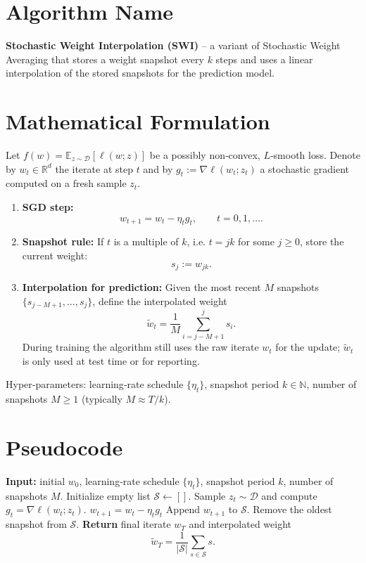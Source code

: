 \documentclass{article}
\newcommand{\E}{\mathbb{E}}
\begin{document}
\section*{Algorithm Name}
\textbf{Stochastic Weight Interpolation (SWI)} – a variant of Stochastic Weight Averaging that stores a weight snapshot every $k$ steps and uses a linear interpolation of the stored snapshots for the prediction model.

\section*{Mathematical Formulation}
Let $f(w)=\E_{z\sim\mathcal{D}}[\ell(w;z)]$ be a possibly non‑convex, $L$‑smooth loss.  
Denote by $w_t\in\mathbb{R}^d$ the iterate at step $t$ and by $g_t:=\nabla\ell(w_t;z_t)$ a stochastic gradient computed on a fresh sample $z_t$.

\begin{enumerate}[label=\arabic*.]
\item \textbf{SGD step:}
\[
w_{t+1}=w_t-\eta_t g_t ,\qquad t=0,1,\dots .
\tag{1}
\]
\item \textbf{Snapshot rule:}  
If $t$ is a multiple of $k$, i.e. $t=jk$ for some $j\ge 0$, store the current weight:
\[
s_j:=w_{jk}.
\tag{2}
\]
\item \textbf{Interpolation for prediction:}  
Given the most recent $M$ snapshots $\{s_{j-M+1},\dots,s_j\}$, define the interpolated weight
\[
\tilde w_{t}= \frac{1}{M}\sum_{i=j-M+1}^{j} s_i .
\tag{3}
\]
During training the algorithm still uses the raw iterate $w_t$ for the update; $\tilde w_t$ is only used at test time or for reporting.
\end{enumerate}

Hyper‑parameters: learning‑rate schedule $\{\eta_t\}$, snapshot period $k\in\mathbb{N}$, number of snapshots $M\ge1$ (typically $M\approx T/k$).

\section*{Pseudocode}
\begin{algorithm}[H]
\caption{Stochastic Weight Interpolation (SWI)}
\begin{algorithmic}[1]
\STATE \textbf{Input:} initial $w_0$, learning‑rate schedule $\{\eta_t\}$, snapshot period $k$, number of snapshots $M$.
\STATE Initialize empty list $\mathcal{S}\gets []$.
    \STATE Sample $z_t\sim\mathcal{D}$ and compute $g_t=\nabla\ell(w_t;z_t)$.
    \STATE $w_{t+1}=w_t-\eta_t g_t$ \hfill{}
        \STATE Append $w_{t+1}$ to $\mathcal{S}$.
            \STATE Remove the oldest snapshot from $\mathcal{S}$.
        \ENDIF
    \ENDIF
\ENDFOR
\STATE \textbf{Return} final iterate $w_T$ and interpolated weight 
\[
\tilde w_T = \frac{1}{|\mathcal{S}|}\sum_{s\in\mathcal{S}} s .
\]
\end{algorithmic}
\end{algorithm}
\end{document}
